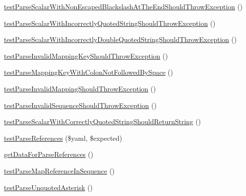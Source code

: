 \begin{DoxyCompactItemize}
\item 
\mbox{\hyperlink{class_symfony_1_1_component_1_1_yaml_1_1_tests_1_1_inline_test_a4c1cda3efc4c142810f87a69035ad5cc}{test\+Parse\+Scalar\+With\+Non\+Escaped\+Blackslash\+At\+The\+End\+Should\+Throw\+Exception}} ()
\item 
\mbox{\hyperlink{class_symfony_1_1_component_1_1_yaml_1_1_tests_1_1_inline_test_a3f3b061ccefc52a84943826a4314e459}{test\+Parse\+Scalar\+With\+Incorrectly\+Quoted\+String\+Should\+Throw\+Exception}} ()
\item 
\mbox{\hyperlink{class_symfony_1_1_component_1_1_yaml_1_1_tests_1_1_inline_test_a8f820b5e7ada70c5f054eb1396a00fe9}{test\+Parse\+Scalar\+With\+Incorrectly\+Double\+Quoted\+String\+Should\+Throw\+Exception}} ()
\item 
\mbox{\hyperlink{class_symfony_1_1_component_1_1_yaml_1_1_tests_1_1_inline_test_ab6c60d5afd7bd8ab17151f8f00639061}{test\+Parse\+Invalid\+Mapping\+Key\+Should\+Throw\+Exception}} ()
\item 
\mbox{\hyperlink{class_symfony_1_1_component_1_1_yaml_1_1_tests_1_1_inline_test_ac4d312ef06b5038633cc37373e0a55af}{test\+Parse\+Mapping\+Key\+With\+Colon\+Not\+Followed\+By\+Space}} ()
\item 
\mbox{\hyperlink{class_symfony_1_1_component_1_1_yaml_1_1_tests_1_1_inline_test_a9950836fa990a0ab5d1450bf095ce9f0}{test\+Parse\+Invalid\+Mapping\+Should\+Throw\+Exception}} ()
\item 
\mbox{\hyperlink{class_symfony_1_1_component_1_1_yaml_1_1_tests_1_1_inline_test_aa9380d52f70e419a4acad13e590546ed}{test\+Parse\+Invalid\+Sequence\+Should\+Throw\+Exception}} ()
\item 
\mbox{\hyperlink{class_symfony_1_1_component_1_1_yaml_1_1_tests_1_1_inline_test_ab1755bc0fab8c4634d386880362011d4}{test\+Parse\+Scalar\+With\+Correctly\+Quoted\+String\+Should\+Return\+String}} ()
\item 
\mbox{\hyperlink{class_symfony_1_1_component_1_1_yaml_1_1_tests_1_1_inline_test_af3ffae0ff4f463239a0b40e242bf6fb2}{test\+Parse\+References}} (\$yaml, \$expected)
\item 
\mbox{\hyperlink{class_symfony_1_1_component_1_1_yaml_1_1_tests_1_1_inline_test_af2b8439eb5e7144cb89fa6019ea9ef72}{get\+Data\+For\+Parse\+References}} ()
\item 
\mbox{\hyperlink{class_symfony_1_1_component_1_1_yaml_1_1_tests_1_1_inline_test_aa08a0e30625487414e42d496adabfc9f}{test\+Parse\+Map\+Reference\+In\+Sequence}} ()
\item 
\mbox{\hyperlink{class_symfony_1_1_component_1_1_yaml_1_1_tests_1_1_inline_test_a654899c8008e663875a1c15d6f4a7631}{test\+Parse\+Unquoted\+Asterisk}} ()

\end{DoxyCompactItemize}
